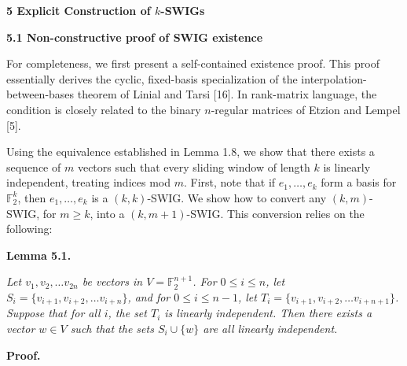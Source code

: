 \par\medskip\noindent\textbf{
5 Explicit Construction of $k$-SWIGs}\par




\par\medskip\noindent\textbf{
5.1 Non-constructive proof of SWIG existence}\par




For completeness, we first present a self-contained existence proof. This proof essentially derives the cyclic, fixed-basis specialization of the
interpolation-between-bases theorem of Linial and Tarsi [16]. In
rank-matrix language, the condition is closely related to the binary
$n$-regular matrices of Etzion and Lempel [5].\par




Using the equivalence established in Lemma 1.8, we show that there exists a sequence of $m$ vectors such that every sliding window of length $k$ is linearly independent, treating indices mod $m$. First, note that if $e_{1},\dots,e_{k}$ form a basis for $\mathbb{F}_{2}^{k}$, then $e_{1},\dots,e_{k}$ is a $(k,k)$-SWIG. We show how to convert any $(k,m)$-SWIG, for $m\geq k$, into a $(k,m+1)$-SWIG. This conversion relies on the following:\par





\par\medskip\noindent\textbf{
\textbf{Lemma 5.1}\textbf{.}
}\par



\emph{Let $v_{1},v_{2},\dots v_{2n}$ be vectors in $V=\mathbb{F}_{2}^{n+1}$. For $0\leq i\leq n$, let $S_{i}=\{v_{i+1},v_{i+2},\dots v_{i+n}\}$, and for $0\leq i\leq n-1$, let $T_{i}=\{v_{i+1},v_{i+2},\dots v_{i+n+1}\}$. Suppose that for all $i$, the set $T_{i}$ is linearly independent. Then there exists a vector $w\in V$ such that the sets $S_{i}\cup\{w\}$ are all linearly independent.}\par






\par\medskip\noindent\textbf{Proof.}\par




